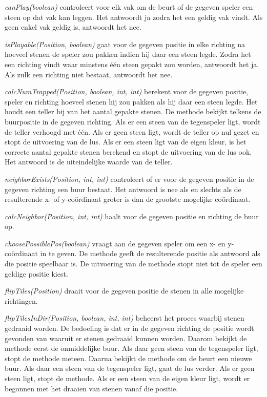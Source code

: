 \textit{canPlay(boolean)} controleert voor elk vak om de beurt of de gegeven speler een steen op dat vak kan leggen. Het antwoordt ja zodra het een geldig vak vindt. Als geen enkel vak geldig is, antwoordt het nee.

\textit{isPlayable(Position, boolean)} gaat voor de gegeven positie in elke richting na hoeveel stenen de speler zou pakken indien hij daar een steen legde. Zodra het een richting vindt waar minstens \'e\'en steen gepakt zou worden, antwoordt het ja. Als zulk een richting niet bestaat, antwoordt het nee.

\textit{calcNumTrapped(Position, boolean, int, int)} berekent voor de gegeven positie, speler en richting hoeveel stenen hij zou pakken als hij daar een steen legde. Het houdt een teller bij van het aantal gepakte stenen. De methode bekijkt telkens de buurpositie in de gegeven richting. Als er een steen van de tegenspeler ligt, wordt de teller verhoogd met \'e\'en. Als er geen steen ligt, wordt de teller op nul gezet en stopt de uitvoering van de lus. Als er een steen ligt van de eigen kleur, is het correcte aantal gepakte stenen berekend en stopt de uitvoering van de lus ook. Het antwoord is de uiteindelijke waarde van de teller.

\textit{neighborExists(Position, int, int)} controleert of er voor de gegeven positie in de gegeven richting een buur bestaat. Het antwoord is nee als en slechts als de resulterende x- of y-co\"ordinaat groter is dan de grootste mogelijke co\"ordinaat.

\textit{calcNeighbor(Position, int, int)} haalt voor de gegeven positie en richting de buur op.

\textit{choosePossiblePos(boolean)} vraagt aan de gegeven speler om een x- en y-co\"ordinaat in te geven. De methode geeft de resulterende positie als antwoord als die positie speelbaar is. De uitvoering van de methode stopt niet tot de speler een geldige positie kiest.

\textit{flipTiles(Position)} draait voor de gegeven positie de stenen in alle mogelijke richtingen.

\textit{flipTilesInDir(Position, boolean, int, int)} beheerst het proces waarbij stenen gedraaid worden. De bedoeling is dat er in de gegeven richting de positie wordt gevonden van waaruit er stenen gedraaid kunnen worden. Daarom bekijkt de methode eerst de onmiddelijke buur. Als daar geen steen van de tegenspeler ligt, stopt de methode meteen. Daarna bekijkt de methode om de beurt een nieuwe buur. Als daar een steen van de tegenspeler ligt, gaat de lus verder. Als er geen steen ligt, stopt de methode. Als er een steen van de eigen kleur ligt, wordt er begonnen met het draaien van stenen vanaf die positie.

